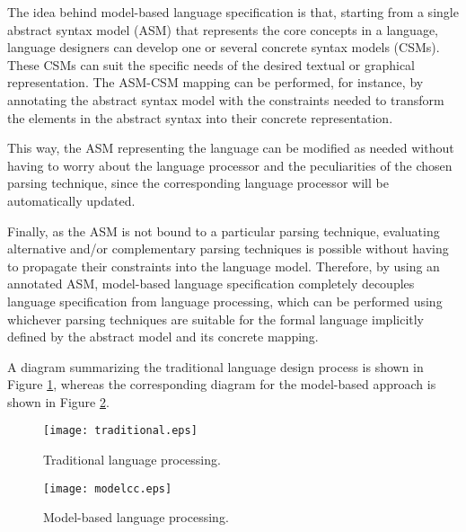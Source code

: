 \documentclass[floatfix,rmp,twocolumn,twoside]{revtex4}
\begin{document}
The idea behind model-based language specification is that, starting from a single abstract syntax model (ASM) that represents the core concepts in a language, language designers can develop one or several concrete syntax models (CSMs). These CSMs can suit the specific needs of the desired textual or graphical representation. The ASM-CSM mapping can be performed, for instance, by annotating the abstract syntax model with the constraints needed to transform the elements in the abstract syntax into their concrete representation.

This way, the ASM representing the language can be modified as needed without having to worry about the language processor and the peculiarities of the chosen parsing technique, since the corresponding language processor will be automatically updated.

Finally, as the ASM is not bound to a particular parsing technique, evaluating alternative and/or complementary parsing techniques is possible without having to propagate their constraints into the language model. Therefore, by using an annotated ASM, model-based language specification completely decouples language specification from language processing, which can be performed using whichever parsing techniques are suitable for the formal language implicitly defined by the abstract model and its concrete mapping.

A diagram summarizing the traditional language design process is shown in Figure \ref{fig:traditional}, whereas the corresponding diagram for the model-based approach is shown in Figure \ref{fig:ModelCC}.

\begin{figure}[h!]
\centering
\texttt{[image: traditional.eps]}
\caption{Traditional language processing.} \label{fig:traditional}
\end{figure}

\begin{figure}[h!]
\centering
\texttt{[image: modelcc.eps]}
\caption{Model-based language processing.} \label{fig:ModelCC}
\end{figure}
\end{document}
